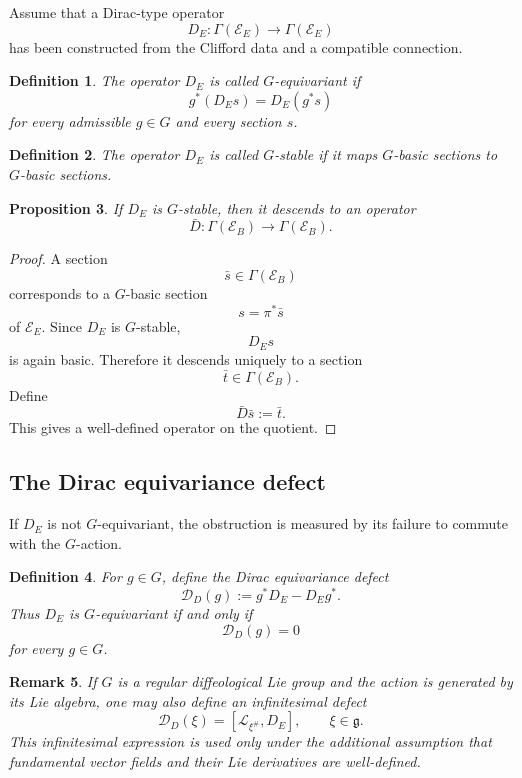 \documentclass[11pt]{amsart}
\newtheorem{definition}{Definition}[section]
\newtheorem{proposition}[definition]{Proposition}
\newtheorem{remark}[definition]{Remark}
\begin{document}
Assume that a Dirac-type operator
\[
D_E:\Gamma(\mathcal E_E)\to \Gamma(\mathcal E_E)
\]
has been constructed from the Clifford data and a compatible connection.

\begin{definition}
The operator \(D_E\) is called \(G\)-equivariant if
\[
g^*(D_Es)=D_E(g^*s)
\]
for every admissible \(g\in G\) and every section \(s\).
\end{definition}

\begin{definition}
The operator \(D_E\) is called \(G\)-stable if it maps \(G\)-basic sections to
\(G\)-basic sections.
\end{definition}

\begin{proposition}
If \(D_E\) is \(G\)-stable, then it descends to an operator
\[
\bar D:\Gamma(\mathcal E_B)\to\Gamma(\mathcal E_B).
\]
\end{proposition}

\begin{proof}
A section
\[
\bar s\in\Gamma(\mathcal E_B)
\]
corresponds to a \(G\)-basic section
\[
s=\pi^*\bar s
\]
of \(\mathcal E_E\). Since \(D_E\) is \(G\)-stable,
\[
D_Es
\]
is again basic. Therefore it descends uniquely to a section
\[
\bar t\in\Gamma(\mathcal E_B).
\]
Define
\[
\bar D\bar s:=\bar t.
\]
This gives a well-defined operator on the quotient.
\end{proof}

\subsection{The Dirac equivariance defect}

If \(D_E\) is not \(G\)-equivariant, the obstruction is measured by its failure
to commute with the \(G\)-action.

\begin{definition}
For \(g\in G\), define the \emph{Dirac equivariance defect}
\[
\mathcal D_D(g)
:=
g^*D_E-D_Eg^*.
\]
Thus \(D_E\) is \(G\)-equivariant if and only if
\[
\mathcal D_D(g)=0
\]
for every \(g\in G\).
\end{definition}

\begin{remark}
If \(G\) is a regular diffeological Lie group and the action is generated by
its Lie algebra, one may also define an infinitesimal defect
\[
\mathcal D_D(\xi)
=
[\mathcal L_{\xi^\#},D_E],
\qquad
\xi\in\mathfrak g.
\]
This infinitesimal expression is used only under the additional assumption
that fundamental vector fields and their Lie derivatives are well-defined.
\end{remark}
\end{document}
